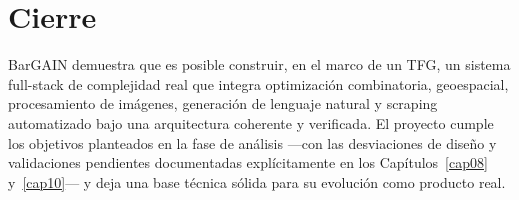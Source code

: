\section{Cierre}\label{sec:cierre}

BarGAIN demuestra que es posible construir, en el marco de un TFG, un sistema full-stack de
complejidad real que integra optimizaci\'on combinatoria, geoespacial, procesamiento de im\'agenes,
generaci\'on de lenguaje natural y scraping automatizado bajo una arquitectura coherente y
verificada. El proyecto cumple los objetivos planteados en la fase de an\'alisis ---con las
desviaciones de dise\~no y validaciones pendientes documentadas expl\'icitamente en los
Cap\'itulos~\ref{cap08} y~\ref{cap10}--- y deja una base t\'ecnica s\'olida para su evoluci\'on
como producto real.
